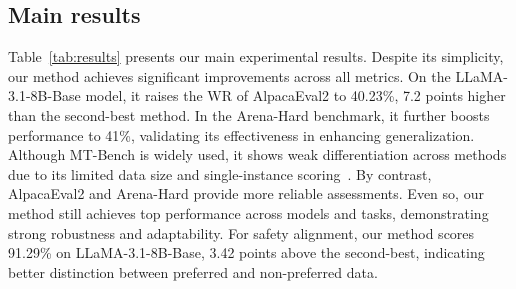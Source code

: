 \subsection{Main results}
Table~\ref{tab:results} presents our main experimental results. Despite its simplicity, our method achieves significant improvements across all metrics. On the LLaMA-3.1-8B-Base model, it raises the WR of AlpacaEval2 to 40.23\%, 7.2 points higher than the second-best method. In the Arena-Hard benchmark, it further boosts performance to 41\%, validating its effectiveness in enhancing generalization.
Although MT-Bench is widely used, it shows weak differentiation across methods due to its limited data size and single-instance scoring~\cite{meng2024simpo, li2024live}. By contrast, AlpacaEval2 and Arena-Hard provide more reliable assessments. Even so, our method still achieves top performance across models and tasks, demonstrating strong robustness and adaptability.
For safety alignment, our method scores 91.29\% on LLaMA-3.1-8B-Base, 3.42 points above the second-best, indicating better distinction between preferred and non-preferred data.

